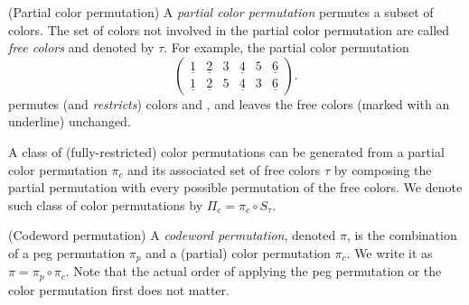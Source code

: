 \begin{definition}
(Partial color permutation) A \emph{partial color permutation} permutes a subset of colors. The set of colors not involved in the partial color permutation are called \emph{free colors} and denoted by $\tau$.
For example, the partial color permutation
\[
\begin{pmatrix}
\underline{1} & \underline{2} & 3 & \underline{4} & 5 & \underline{6} \\
\underline{1} & \underline{2} & 5 & \underline{4} & 3 & \underline{6} 
\end{pmatrix} .
\]
permutes (and \emph{restricts}) colors  and , and leaves the free colors (marked with an underline) unchanged.
\end{definition}

A class of (fully-restricted) color permutations can be generated from a partial color permutation $\pi_c$ and its associated set of free colors $\tau$ by composing the partial permutation with every possible permutation of the free colors. We denote such class of color permutations by $\Pi_c = \pi_c \circ S_\tau$.


\begin{definition}
(Codeword permutation) A \emph{codeword permutation}, denoted $\pi$, is the combination of a peg permutation $\pi_p$ and a (partial) color permutation $\pi_c$. We write it as $\pi = \pi_p \circ \pi_c$. Note that the actual order of applying the peg permutation or the color permutation first does not matter.
\end{definition}

